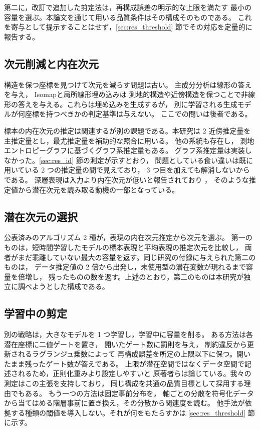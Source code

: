 \documentclass[11pt,a4paper]{jsarticle}
\begin{document}
第二に，改訂で追加した剪定法\cite{deboom2020geco}は，再構成誤差の明示的な上限を満たす
最小の容量を選ぶ。本論文を通じて用いる品質条件はその構成そのものである。
これを寄与として提示することはせず，\ref{sec:res_threshold} 節でその対応を定量的に報告する。

\subsection{次元削減と内在次元}\label{sec:rel_dr}

構造を保つ座標を見つけて次元を減らす問題は古い。
主成分分析\cite{tippingbishop1999ppca}は線形の答えを与え，
Isomap\cite{tenenbaum2000isomap}と局所線形埋め込み\cite{roweis2000lle}は
測地的構造や近傍構造を保つことで非線形の答えを与える。これらは埋め込みを生成するが，
別に学習される生成モデルが何座標を持つべきかの判定基準は与えない。
ここでの問いは後者である。

標本の内在次元の推定は関連するが別の課題である。本研究は 2 近傍推定量\cite{facco2017twonn}を
主推定量とし，最尤推定量\cite{levina2005mle}を補助的な照合に用いる。
他の系統も存在し\cite{ceruti2014danco,johnsson2015ess,camastra2016intrinsic,allegra2020data}，
測地エントロピーグラフに基づくグラフ系推定量\cite{costa2004geodesic}もある。
グラフ系推定量は実装しなかった。\ref{sec:res_id} 節の測定が示すとおり，
問題としている食い違いは既に用いている 2 つの推定量の間で見えており，
3 つ目を加えても解消しないからである。
深層表現は入力より内在次元が低いと報告されており
\cite{ansuini2019intrinsic,pope2021intrinsic}，
そのような推定値から潜在次元を読み取る動機の一部となっている。

\subsection{潜在次元の選択}\label{sec:rel_select}

公表済みのアルゴリズム 2 種が，表現の内在次元推定から次元を選ぶ。
第一のものは，短時間学習したモデルの標本表現と平均表現の推定次元を比較し，
両者がまだ乖離していない最大の容量を返す。同じ研究の付録に与えられた第二のものは，
データ推定値の 2 倍から出発し，未使用型の潜在変数が現れるまで容量を倍増し，
残ったものの数を返す。上述のとおり，第二のものは本研究が独立に調べようとした構成である。

\subsection{学習中の剪定}\label{sec:rel_prune}

別の戦略は，大きなモデルを 1 つ学習し，学習中に容量を削る。
ある方法\cite{deboom2020geco}は各潜在座標に二値ゲートを置き，
開いたゲート数に罰則を与え\cite{louizos2018l0}，
制約違反から更新されるラグランジュ乗数\cite{rezende2018geco}によって
再構成誤差を所定の上限以下に保つ。開いたまま残ったゲート数が答えである。
上限が潜在空間ではなくデータ空間で記述されるため，正則化重みより設定しやすいと
原著者らは論じている。我々の測定はこの主張を支持しており，
同じ構成を共通の品質目標として採用する理由でもある。
もう一つの方法\cite{saha2025ardvae}は固定事前分布を，
軸ごとの分散を符号化データから当てはめる階層事前に置き換え，その分散から関連度を読む。
他手法が依拠する種類の閾値を導入しない。それが何をもたらすかは
\ref{sec:res_threshold} 節に示す。
\end{document}
